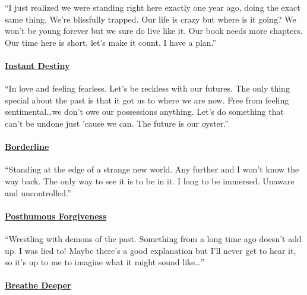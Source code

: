 \documentclass[
]{article}
\begin{document}
``I just realized we were standing right here exactly one year ago,
doing the exact same thing. We're blissfully trapped. Our life is crazy
but where is it going? We won't be young forever but we sure do live
like it. Our book needs more chapters. Our time here is short, let's
make it count. I have a plan.''

\paragraph{\texorpdfstring{\href{https://open.spotify.com/track/6WCXBUFa0z3l9DoOY3k5Xe?si=13691dc253774641}{\textbf{Instant
Destiny}}}{Instant Destiny}}\label{instant-destiny}

``In love and feeling fearless. Let's be reckless with our futures. The
only thing special about the past is that it got us to where we are now.
Free from feeling sentimental\ldots we don't owe our possessions
anything. Let's do something that can't be undone just 'cause we can.
The future is our oyster.''

\paragraph{\texorpdfstring{\href{https://open.spotify.com/track/5hM5arv9KDbCHS0k9uqwjr?si=c0cafa2bab0f4479}{\textbf{Borderline}}}{Borderline}}\label{borderline}

``Standing at the edge of a strange new world. Any further and I won't
know the way back. The only way to see it is to be in it. I long to be
immersed. Unaware and uncontrolled.''

\paragraph{\texorpdfstring{\href{https://open.spotify.com/track/1KcOU0q9AMXV9xi4tSzzCc?si=5b80cd7b48dc4600}{\textbf{Posthumous
Forgiveness}}}{Posthumous Forgiveness}}\label{posthumous-forgiveness}

``Wrestling with demons of the past. Something from a long time ago
doesn't add up. I was lied to! Maybe there's a good explanation but I'll
never get to hear it, so it's up to me to imagine what it might sound
like\ldots{}''

\paragraph{\texorpdfstring{\href{https://open.spotify.com/track/3LbZIhU0smEU5SUnxod4j4?si=b34cb4cf9291400d}{\textbf{Breathe
Deeper}}}{Breathe Deeper}}\label{breathe-deeper}
\end{document}
